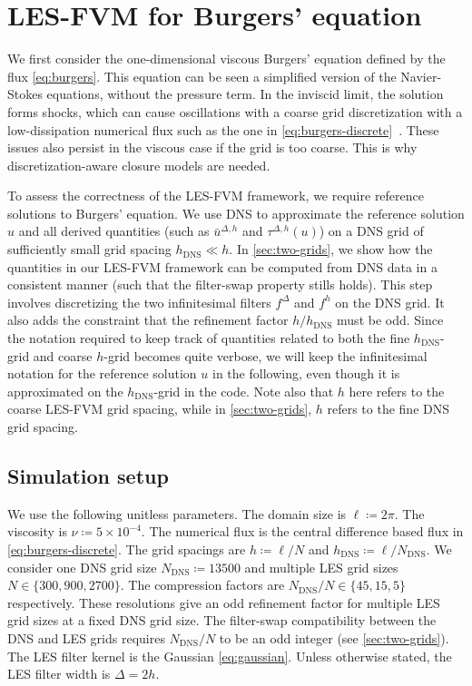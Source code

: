 \documentclass[preprint,twocolumn,5p]{elsarticle}
\begin{document}
\section{LES-FVM for Burgers' equation} \label{sec:burgers}

We first consider the one-dimensional viscous Burgers' equation defined by the
flux \eqref{eq:burgers}.
This equation can be seen a simplified version of the
Navier-Stokes equations, without the pressure term.
In the inviscid limit, the solution forms shocks,
which can cause oscillations with a coarse grid
discretization with a low-dissipation numerical flux such as the one in
\cref{eq:burgers-discrete}~\cite{jamesonConstructionDiscretelyConservative2008}.
These issues also persist in the viscous case if the grid is too coarse.
This is why discretization-aware closure models are needed.


To assess the correctness of the LES-FVM framework,
we require reference solutions to Burgers' equation.
We use DNS to approximate
the reference solution $u$ and all derived quantities
(such as $\bar{u}^{\Delta, h}$ and $\tau^{\Delta, h}(u)$)
on a DNS grid of sufficiently small grid spacing $h_\text{DNS} \ll h$.
In \ref{sec:two-grids},
we show how the quantities in our LES-FVM framework
can be computed from DNS data in a consistent manner
(such that the filter-swap property stills holds).
This step involves discretizing the two infinitesimal filters
$f^\Delta$ and $f^h$ on the DNS grid.
It also adds the constraint that the refinement factor $h / h_\text{DNS}$
must be odd.
Since the notation required to keep track of quantities related
to both the fine $h_\text{DNS}$-grid and coarse $h$-grid becomes quite verbose,
we will keep the infinitesimal notation for the
reference solution $u$ in the following,
even though it is approximated on the
$h_\text{DNS}$-grid in the code.
Note also that $h$ here refers to the coarse LES-FVM grid spacing,
while in \ref{sec:two-grids}, $h$ refers to the fine DNS grid spacing.

\subsection{Simulation setup}


We use the following unitless parameters.
The domain size is $\ell \coloneq 2 \pi$.
The viscosity is $\nu \coloneq 5 \times 10^{-4}$.
The numerical flux is the central difference based flux in
\cref{eq:burgers-discrete}.
The grid spacings are $h \coloneq \ell / N$ and
$h_\text{DNS} \coloneq \ell / N_\text{DNS}$.
We consider one DNS grid size $N_\text{DNS} \coloneq 13500$
and multiple LES grid sizes
$N \in \{ 300, 900, 2700 \}$.
The compression factors are $N_\text{DNS} / N \in \{ 45, 15, 5 \}$ respectively.
These resolutions give an odd refinement factor for
multiple LES grid sizes at a fixed DNS grid size.
The filter-swap compatibility between the DNS and LES grids requires
$N_\text{DNS} / N$ to be an odd integer (see \ref{sec:two-grids}).
The LES filter kernel is the Gaussian \eqref{eq:gaussian}.
Unless otherwise stated, the LES filter width is $\Delta = 2 h$.
\end{document}
